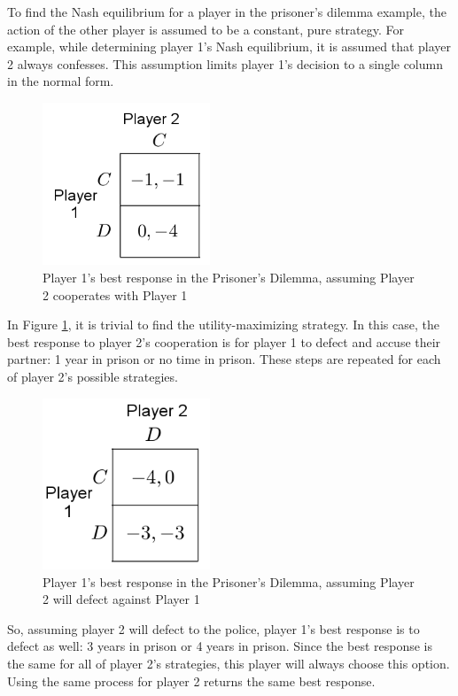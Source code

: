 To find the Nash equilibrium for a player in the prisoner's dilemma example, the action of the other player is assumed to be a constant, pure strategy. For example, while determining player 1's Nash equilibrium, it is assumed that player 2 always confesses. This assumption limits player 1's decision to a single column in the normal form.
\begin{figure}[H]
  \centering
  \includegraphics[width=5cm]{figures/ExamplePartialGrid1.png}
  \caption{Player 1's best response in the Prisoner's Dilemma, assuming Player 2 cooperates with Player 1}
  \label{fig:NashCol1}
\end{figure}

In Figure \ref{fig:NashCol1}, it is trivial to find the utility-maximizing strategy. In this case, the best response to player 2's cooperation is for player 1 to defect and accuse their partner: 1 year in prison or no time in prison. These steps are repeated for each of player 2's possible strategies.
\begin{figure}[H]
  \centering
  \includegraphics[width=5cm]{figures/ExamplePartialGrid2.png}
  \caption{Player 1's best response in the Prisoner's Dilemma, assuming Player 2 will defect against Player 1}
  \label{fig:NashCol2}
\end{figure}
So, assuming player 2 will defect to the police, player 1's best response is to defect as well: 3 years in prison or 4 years in prison. Since the best response is the same for all of player 2's strategies, this player will always choose this option. Using the same process for player 2 returns the same best response.

